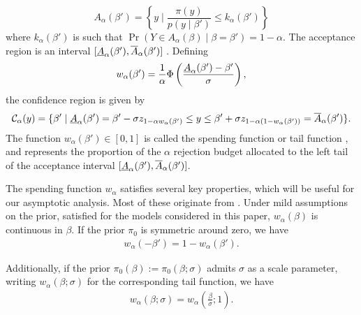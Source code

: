 $$
    A_\alpha(\beta')=\left \{y\mid \frac{\pi(y)}{p(y\mid \beta')}\leq k_\alpha(\beta')\right \}
$$
where $k_\alpha(\beta')$ is such that $\Pr(Y\in A_\alpha(\beta)\mid \beta=\beta')=1-\alpha$. The acceptance region is an interval $[\underline{A}_\alpha(\beta'),\overline{A}_\alpha(\beta')]$ \citep[Theorem 2.1]{Cortinovis2024}. Defining
$$
    w_\alpha(\beta')=\frac{1}{\alpha}\Phi\left( \frac{\underline{A}_\alpha(\beta')-\beta'}{\sigma}\right),
$$
the confidence region is given by
$$
    \mathcal C_\alpha(y)=\{\beta' \mid \underline{A}_\alpha(\beta')=\beta' -\sigma z_{1-\alpha w_\alpha(\beta')}\leq y \leq \beta'+\sigma z_{1-\alpha(1-w_\alpha(\beta')) }=\overline{A}_\alpha(\beta')\}.
$$
The function $w_\alpha(\beta')\in[0,1]$ is called the spending function or tail function \citep{Puza2006,Yu2018}, and represents the proportion of the $\alpha$ rejection budget allocated to the left tail of the acceptance interval $[\underline{A}_\alpha(\beta'),\overline{A}_\alpha(\beta')]$.

The spending function $w_\alpha$ satisfies several key properties, which will be useful for our asymptotic analysis. Most of these originate from \citet{Cortinovis2024}. Under mild assumptions on the prior, satisfied for the models considered in this paper, $w_\alpha(\beta)$ is continuous in $\beta$. If the prior $\pi_0$ is symmetric around zero, we have
\begin{align}
    w_\alpha(-\beta')=1-w_\alpha(\beta').
    \label{eq:propw1}
\end{align}

Additionally, if the prior $\pi_0(\beta):=\pi_0(\beta;\sigma)$ admits $\sigma$ as a scale parameter, writing $w_\alpha(\beta;\sigma)$ for the corresponding tail function, we have
\begin{align}
    w_\alpha(\beta;\sigma)=w_\alpha\left(\frac{\beta}{\sigma};1\right).
    \label{eq:propw2}
\end{align}

